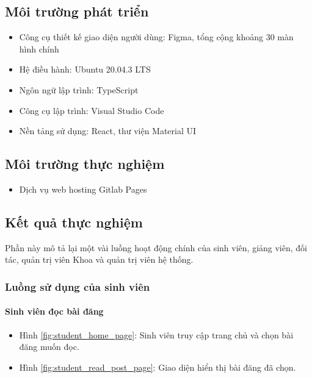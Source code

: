 \documentclass[./../main.tex]{subfiles}
\begin{document}
\subsection{Môi trường phát triển}

\begin{itemize}
	\item Công cụ thiết kế giao diện người dùng: Figma, tổng cộng khoảng 30 màn hình chính
	\item Hệ điều hành: Ubuntu 20.04.3 LTS
	\item Ngôn ngữ lập trình: TypeScript
	\item Công cụ lập trình: Visual Studio Code
	\item Nền tảng sử dụng: React, thư viện Material UI
\end{itemize}

\subsection{Môi trường thực nghiệm}

\begin{itemize}
	\item Dịch vụ web hosting Gitlab Pages
\end{itemize}

\subsection{Kết quả thực nghiệm}

Phần này mô tả lại một vài luồng hoạt động chính của sinh viên, giảng viên, đối tác, quản trị viên Khoa và quản trị viên hệ thống.

\subsubsection{Luồng sử dụng của sinh viên}

\paragraph*{Sinh viên đọc bài đăng}

\begin{itemize}
	\item Hình \ref{fig:student_home_page}: Sinh viên truy cập trang chủ và chọn bài đăng muốn đọc.
	\item Hình \ref{fig:student_read_post_page}: Giao diện hiển thị bài đăng đã chọn.
\end{itemize}
\end{document}
